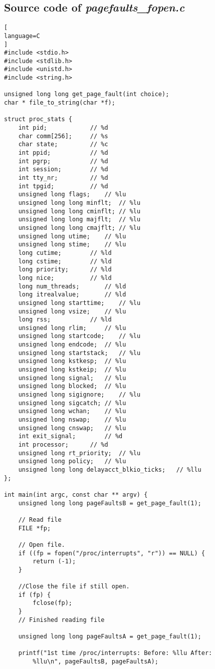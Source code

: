 \begin{appendices}

\chapter{Source code of \textit{pagefaults\_fopen.c}}
\label{app:listingTestPagefault}

\begin{lstlisting}[
language=C
]
#include <stdio.h>
#include <stdlib.h>
#include <unistd.h>
#include <string.h>

unsigned long long get_page_fault(int choice);
char * file_to_string(char *f);

struct proc_stats {
	int pid;			// %d
	char comm[256];		// %s
	char state;			// %c
	int ppid;			// %d
	int pgrp;			// %d
	int session;		// %d
	int tty_nr;			// %d
	int tpgid;			// %d
	unsigned long flags;	// %lu
	unsigned long long minflt;	// %lu
	unsigned long long cminflt;	// %lu
	unsigned long long majflt;	// %lu
	unsigned long long cmajflt;	// %lu
	unsigned long utime;	// %lu
	unsigned long stime; 	// %lu
	long cutime;		// %ld
	long cstime;		// %ld
	long priority;		// %ld
	long nice;			// %ld
	long num_threads;		// %ld
	long itrealvalue;		// %ld
	unsigned long starttime;	// %lu
	unsigned long vsize;	// %lu
	long rss;			// %ld
	unsigned long rlim;		// %lu
	unsigned long startcode;	// %lu
	unsigned long endcode;	// %lu
	unsigned long startstack;	// %lu
	unsigned long kstkesp;	// %lu
	unsigned long kstkeip;	// %lu
	unsigned long signal;	// %lu
	unsigned long blocked;	// %lu
	unsigned long sigignore;	// %lu
	unsigned long sigcatch;	// %lu
	unsigned long wchan;	// %lu
	unsigned long nswap;	// %lu
	unsigned long cnswap;	// %lu
	int exit_signal;		// %d
	int processor;		// %d
	unsigned long rt_priority;	// %lu
	unsigned long policy;	// %lu
	unsigned long long delayacct_blkio_ticks;	// %llu
};

int main(int argc, const char ** argv) {
	unsigned long long pageFaultsB = get_page_fault(1);

	// Read file
	FILE *fp;

	// Open file.
	if ((fp = fopen("/proc/interrupts", "r")) == NULL) {
		return (-1);
	}

	//Close the file if still open.
	if (fp) {
		fclose(fp);
	}
	// Finished reading file

	unsigned long long pageFaultsA = get_page_fault(1);

	printf("1st time /proc/interrupts: Before: %llu After:
	    %llu\n", pageFaultsB, pageFaultsA);


\end{lstlisting}
\end{appendices}
